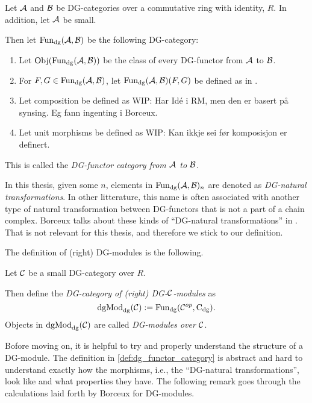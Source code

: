 \begin{definition}
    \label{def:dg_functor_category}
    Let \( {\mathcal{A}} \) and \( {\mathcal{B}} \) be DG-categories over a commutative ring with identity, \( R \). In addition, let \( {\mathcal{A}} \) be small.

    Then let \( \operatorname{Fun}_{\operatorname{dg}}({\mathcal{A}}, {\mathcal{B}}) \) be the following DG-category:
    \begin{enumerate}
        \item{
            Let \( \operatorname{Obj}(\operatorname{Fun}_{\operatorname{dg}}({\mathcal{A}}, {\mathcal{B}})) \) be the class of every DG-functor from \( {\mathcal{A}} \) to \( {\mathcal{B}} \).
        }
        \item{
            For \( F, G \in \operatorname{Fun}_{\operatorname{dg}}({\mathcal{A}}, {\mathcal{B}}) \), let \( \operatorname{Fun}_{\operatorname{dg}}({\mathcal{A}}, {\mathcal{B}})(F, G) \) be defined as in \cite[Proposition 6.3.1]{Borceux_1994}.
        }
        \item {
            Let composition be defined as WIP: Har Idé i RM, men den er basert på synsing. Eg fann ingenting i Borceux.
        }
        \item {
            Let unit morphisms be defined as WIP: Kan ikkje sei før komposisjon er definert.
        }
    \end{enumerate}
    This is called the \emph{DG-functor category from \( {\mathcal{A}} \) to \( {\mathcal{B}} \)}.
\end{definition}

In this thesis, given some \( n \), elements in \( \operatorname{Fun}_{\operatorname{dg}}({\mathcal{A}}, {\mathcal{B}})_n \) are denoted as \emph{DG-natural transformations}. In other litterature, this name is often associated with another type of natural transformation between DG-functors that is not a part of a chain complex. Borceux talks about these kinds of ``DG-natural transformations'' in \cite[Definition 6.2.4]{Borceux_1994}. That is not relevant for this thesis, and therefore we stick to our definition.

The definition of (right) DG-modules is the following.

\begin{definition}
    Let \( {\mathcal{C}} \) be a small DG-category over \( R \).

    Then define the \emph{DG-category of (right) DG-\( {\mathcal{C}} \)-modules} as
    \[
        \operatorname{dgMod}_{\operatorname{dg}}({\mathcal{C}}) := \operatorname{Fun}_{\operatorname{dg}}({\mathcal{C}}^{op}, \operatorname{C}_{\operatorname{dg}}).
    \]
    Objects in \( \operatorname{dgMod}_{\operatorname{dg}}({\mathcal{C}}) \) are called \emph{DG-modules over \( {\mathcal{C}} \)}.
\end{definition}

Bofore moving on, it is helpful to try and properly understand the structure of a DG-module. The definition in \autoref{def:dg_functor_category} is abstract and hard to understand exactly how the morphisms, i.e., the ``DG-natural transformations'', look like and what properties they have. The following remark goes through the calculations laid forth by Borceux for DG-modules.

